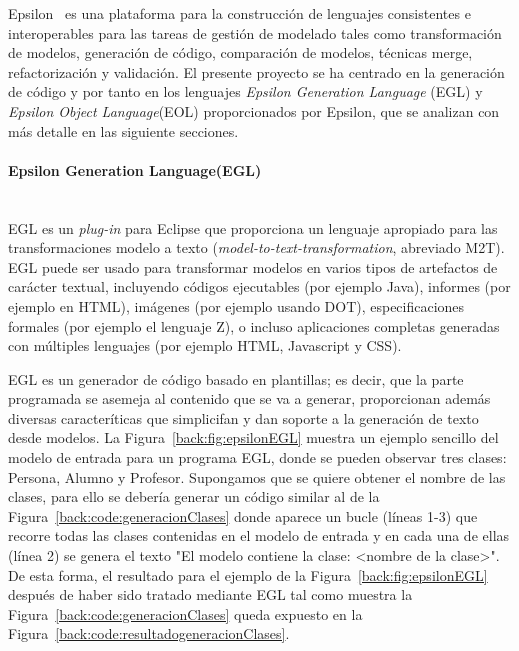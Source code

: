 Epsilon~\cite{kolovos:2008} es una plataforma para la construcción de lenguajes consistentes e interoperables para las tareas de gestión de modelado tales como transformación de modelos, generación de código, comparación de modelos, técnicas merge, refactorización y validación. El presente proyecto se ha centrado en la generación de código y por tanto en los lenguajes \emph{Epsilon Generation Language} (EGL) y \emph{Epsilon Object Language}(EOL) proporcionados por Epsilon, que se analizan con más detalle en las siguiente secciones.

\paragraph{Epsilon Generation Language(EGL)} \ \\

EGL es un \emph{plug-in} para Eclipse que proporciona un lenguaje apropiado para las transformaciones modelo a texto (\emph{model-to-text-transformation}, abreviado M2T). EGL puede ser usado para transformar modelos en varios tipos de artefactos de carácter textual, incluyendo códigos ejecutables (por ejemplo Java), informes (por ejemplo en HTML), imágenes (por ejemplo usando DOT), especificaciones formales (por ejemplo el lenguaje Z), o incluso aplicaciones completas generadas con múltiples lenguajes (por ejemplo HTML, Javascript y CSS).

EGL es un generador de código basado en plantillas; es decir, que la parte programada se asemeja al contenido que se va a generar, proporcionan además diversas caracteríticas que simplicifan y dan soporte a la generación de texto desde modelos. La Figura~\ref{back:fig:epsilonEGL} muestra un ejemplo sencillo del modelo de entrada para un programa EGL, donde se pueden observar tres clases: Persona, Alumno y Profesor. Supongamos que se quiere obtener el nombre de las clases, para ello se debería generar un código similar al de la Figura~\ref{back:code:generacionClases} donde aparece un bucle (líneas 1-3) que recorre todas las clases contenidas en el modelo de entrada y en cada una de ellas (línea 2) se genera el texto "El modelo contiene la clase: <nombre de la clase>". De esta forma, el resultado para el ejemplo de la Figura~\ref{back:fig:epsilonEGL} después de haber sido tratado mediante EGL tal como muestra la Figura~\ref{back:code:generacionClases} queda expuesto en la Figura~\ref{back:code:resultadogeneracionClases}.

